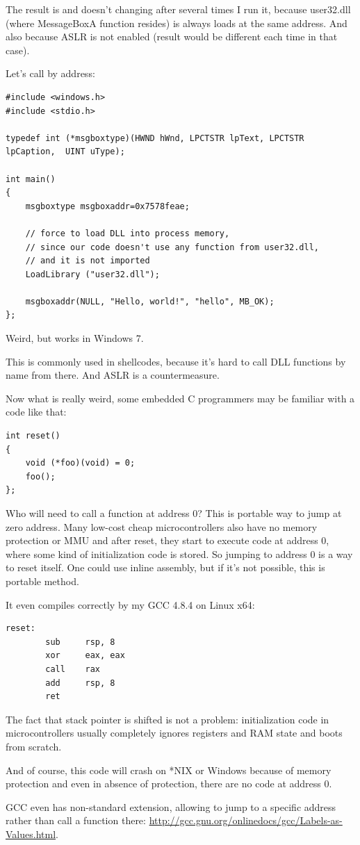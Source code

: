 The result is  and doesn't changing after several times I run it,
because user32.dll (where MessageBoxA function resides) is always loads at the same address.
And also because \ac{ASLR} is not enabled (result would be different each time in that case).

Let's call  by address:

\begin{lstlisting}
#include <windows.h>
#include <stdio.h>

typedef int (*msgboxtype)(HWND hWnd, LPCTSTR lpText, LPCTSTR lpCaption,  UINT uType);

int main()
{
	msgboxtype msgboxaddr=0x7578feae;

	// force to load DLL into process memory, 
	// since our code doesn't use any function from user32.dll, 
	// and it is not imported
	LoadLibrary ("user32.dll");

	msgboxaddr(NULL, "Hello, world!", "hello", MB_OK);
};
\end{lstlisting}

Weird, but works in Windows 7.

This is commonly used in shellcodes, because it's hard to call DLL functions by name from there.
And \ac{ASLR} is a countermeasure.

Now what is really weird, some embedded C programmers may be familiar with a code like that:

\begin{lstlisting}
int reset()
{
	void (*foo)(void) = 0;
	foo();
};
\end{lstlisting}

Who will need to call a function at address 0?
This is portable way to jump at zero address.
Many low-cost cheap microcontrollers also have no memory protection or \ac{MMU} and after reset, they start to execute code at address 0, where some kind of initialization code is stored.
So jumping to address 0 is a way to reset itself.
One could use inline assembly, but if it's not possible, this is portable method.

It even compiles correctly by my GCC 4.8.4 on Linux x64:

\begin{lstlisting}
reset:
        sub     rsp, 8
        xor     eax, eax
        call    rax
        add     rsp, 8
        ret
\end{lstlisting}

The fact that stack pointer is shifted is not a problem: initialization code in microcontrollers usually completely ignores registers and RAM state and boots from scratch.

And of course, this code will crash on *NIX or Windows because of memory protection and even in absence of protection, there are no code at address 0.

GCC even has non-standard extension, allowing to jump to a specific address rather than call a function there: \url{http://gcc.gnu.org/onlinedocs/gcc/Labels-as-Values.html}.

